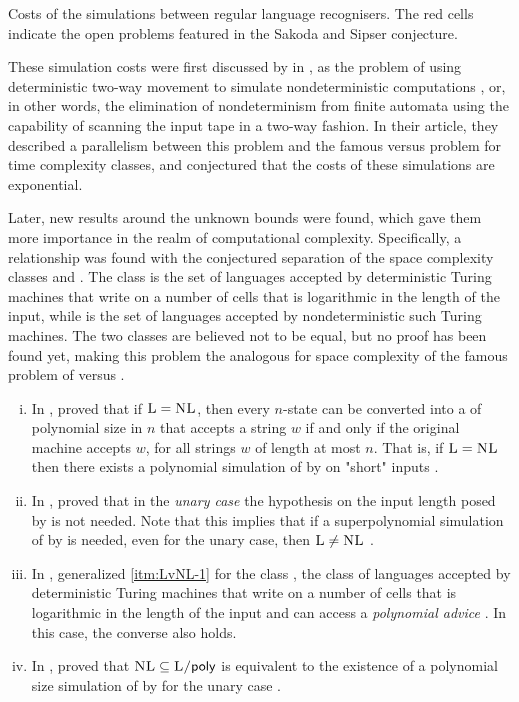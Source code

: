 \begin{table}
	\centering
	\caption[Costs of the simulations between regular language recognisers.]{Costs of the simulations between regular language recognisers.
		The red cells indicate the open problems featured in the Sakoda and Sipser conjecture.}
	\label{tab:sims-core-general-context}
\end{table}

These simulation costs were first discussed by \citeauthor{SakSip78} in \citeyear{SakSip78}, as the problem of using deterministic two-way movement to simulate nondeterministic computations \cite{SakSip78}, or, in other words, the elimination of nondeterminism from finite automata using the capability of scanning the input tape in a two-way fashion.
In their article, they described a parallelism between this problem and the famous \cP versus \cNP problem for time complexity classes, and conjectured that the costs of these simulations are exponential.

Later, new results around the unknown bounds were found, which gave them more importance in the realm of computational complexity.
Specifically, a relationship was found with the conjectured separation of the space complexity classes \cL and \cNL.
The class \cL is the set of languages accepted by deterministic Turing machines that write on a number of cells that is logarithmic in the length of the input, while \cNL is the set of languages accepted by nondeterministic such Turing machines.
The two classes are believed not to be equal, but no proof has been found yet, making this problem the analogous for space complexity of the famous problem of \cP versus \cNP.
\begin{enumerate}[(i)]
	\item\label{itm:LvNL-1} In \citeyear{BerLin77}, \citeauthor{BerLin77} proved that if $\textsc{L}=\textsc{NL}$, then every $n$-state \TNFA can be converted into a \TDFA of polynomial size in $n$ that accepts a string $w$ if and only if the original machine accepts $w$, for all strings $w$ of length at most $n$.
	      That is, if $\textsc{L}=\textsc{NL}$ then there exists a polynomial simulation of \TNFAs by \TDFAs on "short" inputs \cite{BerLin77}.
	\item In \citeyear{GefPig11}, \citeauthor{GefPig11} proved that in the \emph{unary case} the hypothesis on the input length posed by \citeauthor{BerLin77} is not needed.
	      Note that this implies that if a superpolynomial simulation of \TNFAs by \TDFAs is needed, even for the unary case, then $\textsc{L}\ne\textsc{NL}$ \cite{GefPig11}.
	\item In \citeyear{Kap14}, \citeauthor{Kap14} generalized \ref{itm:LvNL-1} for the class \cPolyL, the class of languages accepted by deterministic Turing machines that write on a number of cells that is logarithmic in the length of the input and can access a \emph{polynomial advice} \cite{Kap14,KarLip82}. In this case, the converse also holds.
	\item In \citeyear{KapPig12}, \citeauthor{KapPig12} proved that $\textsc{NL}\subseteq\textsc{L/\ensuremath{\mathsf{poly}}}$ is equivalent to the existence of a polynomial size simulation of \TNFAs by \TDFAs for the unary case \cite{KapPig12}.
\end{enumerate}


